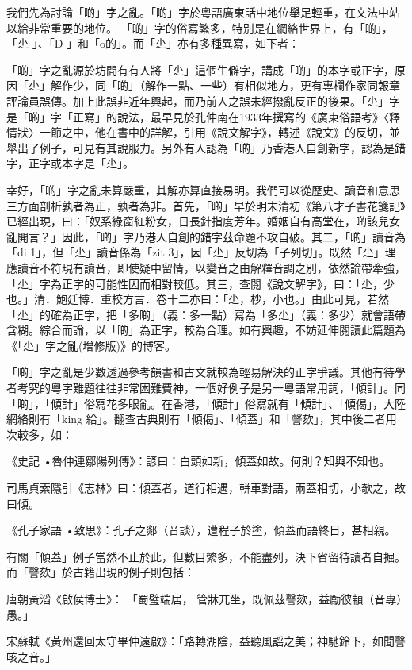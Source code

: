 \documentclass[a5paper, 10pt, openany]{book} %
\begin{document}
我們先為討論「啲」字之亂。「啲」字於粵語廣東話中地位舉足輕重，在文法中站以給非常重要的地位。 「啲」字的俗寫繁多，特別是在網絡世界上，有「啲」，「尐 」、「D 」和「o的」。而「尐」亦有多種異寫，如下者：


「啲」字之亂源於坊間有有人將「尐」這個生僻字，講成「啲」的本字或正字，原因「尐」解作少，同「啲」（解作一點、一些）有相似地方，更有專欄作家同報章評論員誤傳。加上此誤非近年興起，而乃前人之誤未經撥亂反正的後果。「尐」字是「啲」字「正寫」的說法，最早見於孔仲南在1933年撰寫的《廣東俗語考》〈釋情狀〉一節之中，他在書中的詳解，引用《說文解字》，轉述《說文》的反切，並舉出了例子，可見有其說服力。另外有人認為「啲」乃香港人自創新字，認為是錯字，正字或本字是「尐」。

幸好，「啲」字之亂未算嚴重，其解亦算直接易明。我們可以從歷史、讀音和意思三方面剖析孰者為正，孰者為非。首先，「啲」早於明末清初《第八才子書花箋記》已經出現，曰：「奴系綠窗紅粉女，日長針指度芳年。婚姻自有高堂在，啲該兒女亂開言？」因此，「啲」字乃港人自創的錯字茲命題不攻自破。其二，「啲」讀音為「di 1」，但「尐」讀音係為「zit 3」，因「尐」反切為「子列切」。既然「尐」理應讀音不符現有讀音，即使疑中留情，以變音之由解釋音調之別，依然論帶牽強，「尐」字為正字的可能性因而相對較低。其三，查閱《說文解字》，曰：「尐，少也。」清．鮑廷博．重校方言．卷十二亦曰：「尐，杪，小也。」由此可見，若然「尐」的確為正字，把「多啲」（義：多一點）寫為「多尐」（義：多少）就會語帶含糊。綜合而論，以「啲」為正字，較為合理。如有興趣，不妨延伸閱讀此篇題為《「尐」字之亂(增修版)》的博客。

「啲」字之亂是少數透過參考韻書和古文就較為輕易解決的正字爭議。其他有待學者考究的粵字難題往往非常困難費神，一個好例子是另一粵語常用詞，「傾計」。同「啲」，「傾計」俗寫花多眼亂。在香港，「傾計」俗寫就有「傾計」、「傾偈」，大陸網絡則有「king 給」。翻查古典則有「傾偈」、「傾蓋」和「謦欬」，其中後二者用次較多，如：

《史記 •魯仲連鄒陽列傳》：諺曰：白頭如新，傾蓋如故。何則？知與不知也。

司馬貞索隱引《志林》曰：傾蓋者，道行相遇，軿車對語，兩蓋相切，小欹之，故曰傾。

《孔子家語 •致思》：孔子之郯（音談），遭程子於塗，傾蓋而語終日，甚相親。

有關「傾蓋」例子當然不止於此，但數目繁多，不能盡列，決下省留待讀者自掘。而「謦欬」於古籍出現的例子則包括：

唐朝黃滔《啟侯博士》： 「蜀璧端居， 管牀兀坐，既佩茲謦欬，益勵彼顓（音專）愚。」

宋蘇軾《黃州還回太守畢仲遠啟》：「路轉湖陰，益聽風謡之美；神馳鈴下，如聞謦咳之音。」
\end{document}
